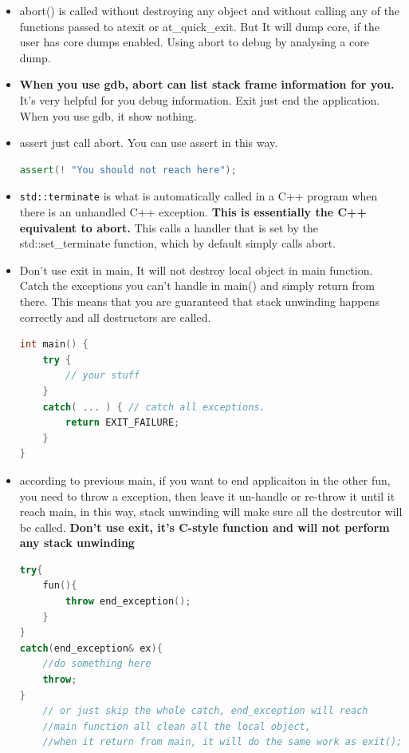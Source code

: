\documentclass[a4paper,11pt,twoside]{book}
\begin{document}
\begin{itemize}
	\item abort() is called without destroying any object and without calling any of the functions passed to atexit or at\_quick\_exit. But It will dump core, if the user has core dumps enabled. Using abort to debug by analysing a core dump.
	
	\item \textbf{When you use gdb, abort can list stack frame information for you.} It's very helpful for you debug information.  Exit just end the application. When you use gdb, it show nothing.
	
	
	\item assert just call abort. You can use assert in this way.
\begin{lstlisting}[frame=single, language=c++]
assert(! "You should not reach here");
\end{lstlisting}
	
	\item \texttt{std::terminate} is what is automatically called in a C++ program when there is an unhandled C++ exception. \textbf{This is essentially the C++ equivalent to abort.} This calls a handler that is set by the std::set\_terminate function, which by default simply calls abort.
	
	\item Don't use exit in main, It will not destroy local object in main function. Catch the exceptions you can't handle in main() and simply return from there. This means that you are guaranteed that stack unwinding happens correctly and all destructors are called.
\begin{lstlisting}[frame=single, language=c++]
int main() {
	try {
		// your stuff
	}
	catch( ... ) { // catch all exceptions.
		return EXIT_FAILURE;
	}
}
	\end{lstlisting}
	
	\item according to previous main, if you want to end applicaiton in the other fun, you need to throw a exception, then leave it un-handle or re-throw it until it reach main, in this way, stack unwinding will make sure all the destrcutor will be called. \textbf{Don't use exit, it's C-style function and will not perform any stack unwinding}
\begin{lstlisting}[frame=single, language=c++]
try{
	fun(){
		throw end_exception();
	}
}
catch(end_exception& ex){
	//do something here
	throw;
}
	// or just skip the whole catch, end_exception will reach
	//main function all clean all the local object,
	//when it return from main, it will do the same work as exit();
\end{lstlisting}
	
\end{itemize}
\end{document}
